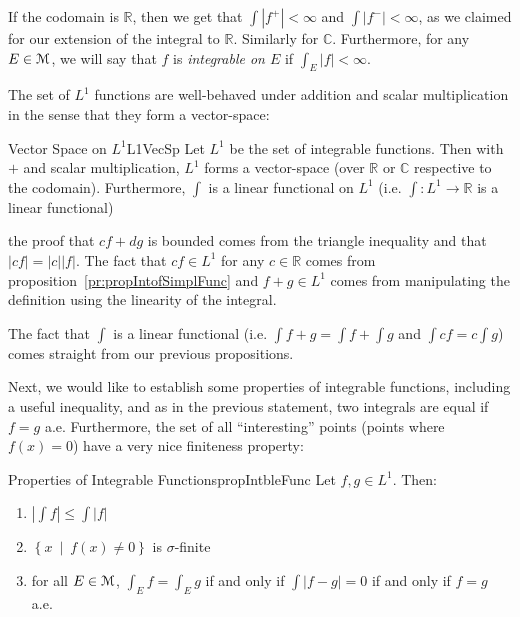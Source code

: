\documentclass[oneside]{book}
\newcommand{\R}{\mathbb{R}}
\renewcommand{\C}{\mathbb{C}}
\newcommand{\EM}{\EuScript{M}}
\newcommand{\set}[2]{\left\{#1 \ \middle|\ #2\right\}}
\newcommand{\rw}{\rightarrow}
\begin{document}
If the codomain is $\R$, then we get that $\int |f^+| < \infty$ and $\int |f^-| < \infty$, as we claimed for our
extension of the integral to $\R$. Similarly for $\C$. Furthermore, for any $E \in \EM$, we will say that $f$ is
\emph{integrable on $E$} if $\int_E |f| < \infty$.

The set of $L^1$ functions are well-behaved under addition and scalar multiplication in the sense that they form
a vector-space:

\begin{prop}{Vector Space on $L^1$}{L1VecSp}
	Let $L^1$ be the set of integrable functions. Then with $+$ and scalar multiplication, $L^1$ forms a vector-space
	(over $\R$ or $\C$ respective to the codomain). Furthermore, $\int$ is a linear functional on $L^1$ (i.e. $\int: L^1 \rw \R$ is a linear functional)
\end{prop}

\begin{Proof}
	the proof that $cf + dg$ is bounded comes from the triangle inequality and that $|cf| = |c||f|$. The fact that $cf
	\in L^1$ for any $c \in \R$ comes from proposition~\ref{pr:propIntofSimplFunc} and $f+g \in L^1$ comes from
	manipulating the definition using the linearity of the integral. 

	The fact that $\int $ is a linear functional (i.e. $\int f+g = \int f+ \int g$ and $\int cf = c\int g $) comes
	straight from our previous propositions. 
\end{Proof}

Next, we would like to establish some properties of integrable functions, including a useful inequality, and as in the
previous statement, two integrals are equal if $f = g$ a.e. Furthermore, the set of all ``interesting'' points (points
where $f(x) = 0$) have a very nice finiteness property:

\begin{prop}{Properties of Integrable Functions}{propIntbleFunc}
	Let $f,g \in L^1$. Then:
	\begin{enumerate}
		\item $\left|\int f\right| \le \int |f|$
		\item $\set{x}{f(x) \ne 0}$ is $\sigma$-finite
		\item for all $E \in \EM$, $\int_E f = \int_E g$ if and only if $\int |f-g| = 0$ if and only if $f = g$ a.e.
	\end{enumerate}
\end{prop}
\end{document}
